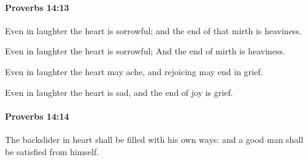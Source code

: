 		\paragraph{Proverbs 14:13} %
			\label{PROVERBS-14-13}

			Even in laughter the heart is sorrowful; and the end of that mirth is heaviness.

			\begin{versebox}
					\item[BHS] 
					\item[ASV] Even in laughter the heart is sorrowful; And the end of mirth is heaviness.
					\item[NIV] Even in laughter the heart may ache, and rejoicing may end in grief.
					\item[NRSV] Even in laughter the heart is sad, and the end of joy is grief.
			\end{versebox}

		\paragraph{Proverbs 14:14} %
			\label{PROVERBS-14-14}

			The backslider in heart shall be filled with his own ways: and a good man shall be satisfied from himself.

